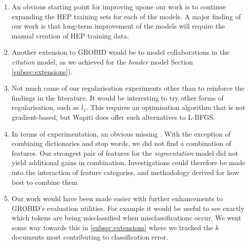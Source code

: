 \begin{enumerate}

\item An obvious starting point for improving upone our work is to continue expanding the HEP training sets for each of the models. A major finding of our work is that long-term improvement of the models will require the manual creation of HEP training data. 

\item Another extension to GROBID would be to model collaborations in the \emph{citation} model, as we achieved for the \emph{header} model Section \ref{subsec:extensions}).

\item Not much came of our regularisation experiments other than to reinforce the findings in the literature. It would be interesting to try other forms of regularisation, such as $l_1$. This requires an optimisation algorithm that is not gradient-based, but Wapiti does offer such alternatives to L-BFGS.

\item In terms of experimentation, an obvious missing . With the exception of combining dictionaries and stop words, we did not find a combination of features. Our strongest pair of features for the \emph{segmentation} model did not yield additional gains in combination. Investigations could therefore be made into the interaction of feature categories, and methodology derived for how best to combine them

\item Our work would have been made easier with further enhancements to GROBID's evaluation utilities. For example it would be useful to see exactly which tokens are being misclassified when misclassificationc occur. We went some way towards this in \ref{subsec:extensions} where we tracked the $k$ documents most contributing to classification error.

\end{enumerate}

